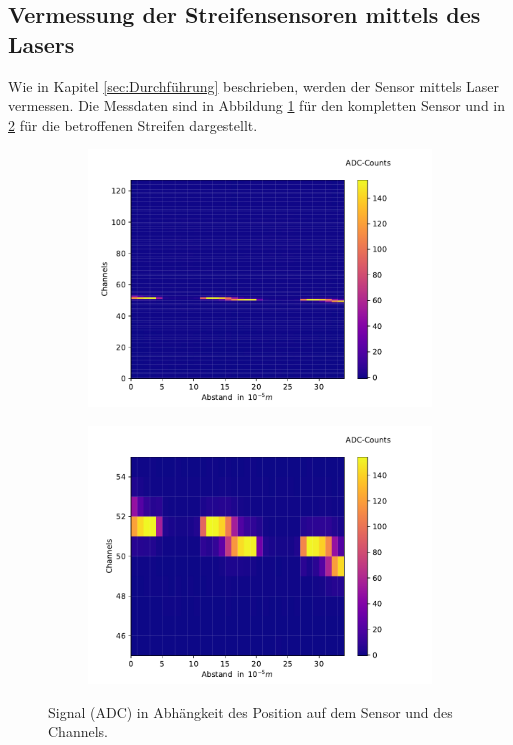 \subsection{Vermessung der Streifensensoren mittels des Lasers}

Wie in Kapitel \ref{sec:Durchführung} beschrieben, werden der Sensor mittels Laser vermessen. Die Messdaten sind in Abbildung \ref{fig:laserscan_komplett} für den kompletten Sensor und in \ref{fig:laserscan_zoom} für die betroffenen Streifen dargestellt.

\begin{figure}[H]
\centering
\begin{subfigure}{.5\textwidth}
	\centering
	\includegraphics[width=1.05\textwidth]{build/Laserscan_komplett.pdf}
	\caption{}
	\label{fig:laserscan_komplett}
\end{subfigure}%
\begin{subfigure}{.5\textwidth}
	\centering
	\includegraphics[width=1.05\textwidth]{build/Laserscan_zoom.pdf}
	\caption{}
	\label{fig:laserscan_zoom}
\end{subfigure}
\caption{Signal (ADC) in Abhängkeit des Position auf dem Sensor und des Channels.}
\label{fig:ladserscan}
\end{figure}

